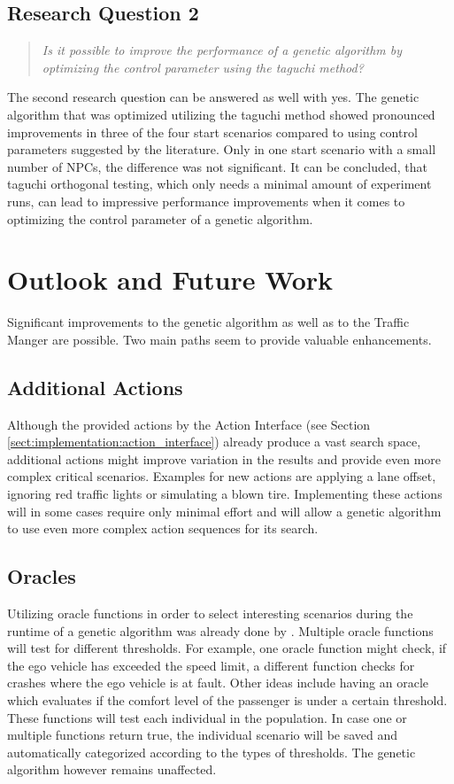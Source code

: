 \subsection{Research Question 2}
\begin{quote}
	\begin{em}
		\textit{Is it possible to improve the performance of a genetic algorithm by optimizing the control parameter using the taguchi method?}
	\end{em}
\end{quote}

The second research question can be answered as well with yes. The genetic algorithm that was optimized utilizing the taguchi method showed pronounced improvements in three of the four start scenarios compared to using control parameters suggested by the literature. Only in one start scenario with a small number of NPCs, the difference was not significant. It can be concluded, that taguchi orthogonal testing, which only needs a minimal amount of experiment runs, can lead to impressive performance improvements when it comes to optimizing the control parameter of a genetic algorithm.

\section{Outlook and Future Work}
Significant improvements to the genetic algorithm as well as to the Traffic Manger are possible. Two main paths seem to provide valuable enhancements.

\subsection{Additional Actions}
Although the provided actions by the Action Interface (see Section \ref{sect:implementation:action_interface}) already produce a vast search space, additional actions might improve variation in the results and provide even more complex critical scenarios. Examples for new actions are applying a lane offset, ignoring red traffic lights or simulating a blown tire. Implementing these actions will in some cases require only minimal effort and will allow a genetic algorithm to use even more complex action sequences for its search.

\subsection{Oracles}
Utilizing oracle functions in order to select interesting scenarios during the runtime of a genetic algorithm was already done by \cite{almanee_scenorita_2021}. Multiple oracle functions will test for different thresholds. For example, one oracle function might check, if the ego vehicle has exceeded the speed limit, a different function checks for crashes where the ego vehicle is at fault. Other ideas include having an oracle which evaluates if the comfort level of the passenger is under a certain threshold. These functions will test each individual in the population. In case one or multiple functions return true, the individual scenario will be saved and automatically categorized according to the types of thresholds. The genetic algorithm however remains unaffected.

